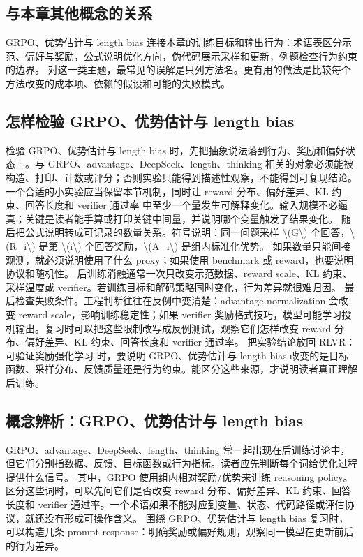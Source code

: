 \documentclass[a4paper]{article}
\begin{document}
\subsection{与本章其他概念的关系}
GRPO、优势估计与 length bias 连接本章的训练目标和输出行为：术语表区分示范、偏好与奖励，公式说明优化方向，伪代码展示采样和更新，例题检查行为约束的边界。
对这一类主题，最常见的误解是只列方法名。更有用的做法是比较每个方法改变的成本项、依赖的假设和可能的失败模式。
\subsection{怎样检验 GRPO、优势估计与 length bias}
检验 GRPO、优势估计与 length bias 时，先把抽象说法落到行为、奖励和偏好状态上。与 GRPO、advantage、DeepSeek、length、thinking 相关的对象必须能被构造、打印、计数或评分；否则实验只能得到描述性观察，不能得到可复现结论。
一个合适的小实验应当保留本节机制，同时让 reward 分布、偏好差异、KL 约束、回答长度和 verifier 通过率 中至少一个量发生可解释变化。输入规模不必逼真；关键是读者能手算或打印关键中间量，并说明哪个变量触发了结果变化。
随后把公式说明转成可记录的数量关系。符号说明：同一问题采样 \textbackslash{}(G\textbackslash{}) 个回答，\textbackslash{}(R\_i\textbackslash{}) 是第 \textbackslash{}(i\textbackslash{}) 个回答奖励，\textbackslash{}(A\_i\textbackslash{}) 是组内标准化优势。 如果数量只能间接观测，就必须说明使用了什么 proxy；如果使用 benchmark 或 reward，也要说明协议和随机性。
后训练消融通常一次只改变示范数据、reward scale、KL 约束、采样温度或 verifier。若训练目标和解码策略同时变化，行为差异就很难归因。
最后检查失败条件。工程判断往往在反例中变清楚：advantage normalization 会改变 reward scale，影响训练稳定性；如果 verifier 奖励格式技巧，模型可能学习投机输出。复习时可以把这些限制改写成反例测试，观察它们怎样改变 reward 分布、偏好差异、KL 约束、回答长度和 verifier 通过率。
把实验结论放回 RLVR：可验证奖励强化学习 时，要说明 GRPO、优势估计与 length bias 改变的是目标函数、采样分布、反馈质量还是行为约束。能区分这些来源，才说明读者真正理解后训练。
\subsection{概念辨析：GRPO、优势估计与 length bias}
GRPO、advantage、DeepSeek、length、thinking 常一起出现在后训练讨论中，但它们分别指数据、反馈、目标函数或行为指标。读者应先判断每个词给优化过程提供什么信号。
其中，GRPO 使用组内相对奖励/优势来训练 reasoning policy。
区分这些词时，可以先问它们是否改变 reward 分布、偏好差异、KL 约束、回答长度和 verifier 通过率。一个术语如果不能对应到变量、状态、代码路径或评估协议，就还没有形成可操作含义。
围绕 GRPO、优势估计与 length bias 复习时，可以构造几条 prompt-response：明确奖励或偏好规则，观察同一模型在更新前后的行为差异。
\end{document}
